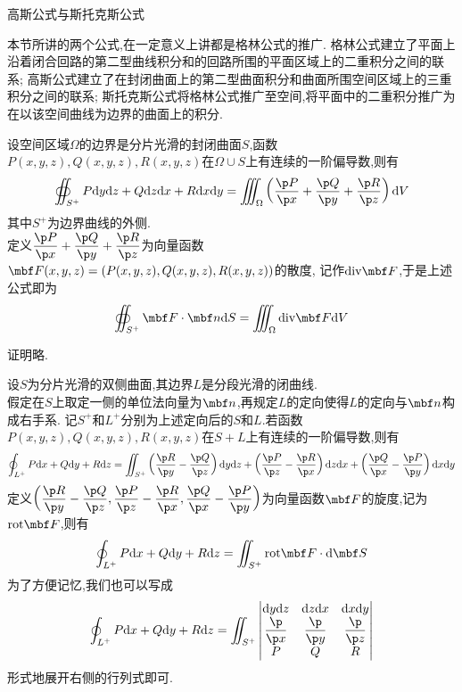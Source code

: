 \documentclass{ctexart}
\begin{document}
\pagestyle{empty}
\begin{center}\large 高斯公式与斯托克斯公式\end{center}
本节所讲的两个公式,在一定意义上讲都是格林公式的推广.%
格林公式建立了平面上沿着闭合回路的第二型曲线积分和的回路所围的平面区域上的二重积分之间的联系;%
高斯公式建立了在封闭曲面上的第二型曲面积分和曲面所围空间区域上的三重积分之间的联系;%
斯托克斯公式将格林公式推广至空间,将平面中的二重积分推广为在以该空间曲线为边界的曲面上的积分.\\
\begin{formal}[1.1 高斯公式]
    设空间区域$\Omega$的边界是分片光滑的封闭曲面$S$,函数$P(x,y,z),Q(x,y,z),R(x,y,z)$在$\Omega\cup S$上有连续的一阶偏导数,则有
    \[\oiint_{S^+}P\di y\di z+Q\di z\dx+R\dx\di y=\iiint_{\Omega}\left(\dfrac{\p P}{\p x}+\dfrac{\p Q}{\p y}+\dfrac{\p R}{\p z}\right)\di V\]
    其中$S^+$为边界曲线的外侧.\\
    定义$\dfrac{\p P}{\p x}+\dfrac{\p Q}{\p y}+\dfrac{\p R}{\p z}$为向量函数$\mbf F(x,y,z)=\left(P(x,y,z),Q(x,y,z),R(x,y,z)\right)$的散度,%
    记作$\text{div}\mbf F$,于是上述公式即为
    \[\oiint_{S^+}\mbf F\cdot\mbf n\di S=\iiint_{\Omega}\text{div}\mbf F\di V\]
\end{formal}\noindent
证明略.\\
\begin{formal}[2.1 斯托克斯公式]
    设$S$为分片光滑的双侧曲面,其边界$L$是分段光滑的闭曲线.\\
    假定在$S$上取定一侧的单位法向量为$\mbf n$,再规定$L$的定向使得$L$的定向与$\mbf n$构成右手系.%
    记$S^+$和$L^+$分别为上述定向后的$S$和$L$.若函数$P(x,y,z),Q(x,y,z),R(x,y,z)$在$S+L$上有连续的一阶偏导数,则有
    \[\oint_{L^+}P\dx+Q\di y+R\di z=\iint_{S^+}\left(\dfrac{\p R}{\p y}-\dfrac{\p Q}{\p z}\right)\di y\di z+\left(\dfrac{\p P}{\p z}-\dfrac{\p R}{\p x}\right)\di z\di x+\left(\dfrac{\p Q}{\p x}-\dfrac{\p P}{\p y}\right)\dx\di y\]
    定义$\left(\dfrac{\p R}{\p y}-\dfrac{\p Q}{\p z},\dfrac{\p P}{\p z}-\dfrac{\p R}{\p x},\dfrac{\p Q}{\p x}-\dfrac{\p P}{\p y}\right)$为向量函数$\mbf F$的旋度,记为$\text{rot}\mbf F$,则有
    \[\oint_{L^+}P\dx+Q\di y+R\di z=\iint_{S^+}\text{rot}\mbf F\cdot\di \mbf S\]
    为了方便记忆,我们也可以写成
    \[\oint_{L^+}P\dx+Q\di y+R\di z=\iint_{S^+}\begin{vmatrix}
        \di y\di z&\di z\di x&\di x\di y\\
        \dfrac{\p}{\p x}&\dfrac{\p}{\p y}&\dfrac{\p}{\p z}\\
        P&Q&R
    \end{vmatrix}\]
    形式地展开右侧的行列式即可.
\end{formal}
\end{document}
